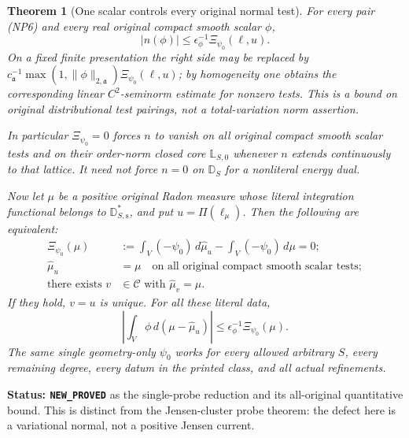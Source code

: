 \documentclass[11pt,a4paper]{article}
\numberwithin{equation}{section}
\newtheorem{theorem}{Theorem}[section]
\theoremstyle{definition}
\theoremstyle{remark}
\begin{document}
\begin{theorem}[One scalar controls every original normal test]
\label{thm:r12-one-probe-normal-detector}
For every pair \textup{(NP6)} and every real original
compact smooth scalar $\phi$,
\[
            |n(\phi)|
                 \le\epsilon_\phi^{-1}\Xi_{\psi_0}(\ell,u).
 \tag{NP8}
\]
On a fixed finite presentation the right side may be
replaced by
$c_{\mathfrak a}^{-1}\max(1,\|\phi\|_{2,\mathfrak a})
\Xi_{\psi_0}(\ell,u)$; by homogeneity one obtains the
corresponding linear $C^2$-seminorm estimate for nonzero
tests.  This is a bound on original distributional test
pairings, not a total-variation norm assertion.

In particular $\Xi_{\psi_0}=0$ forces $n$ to vanish on
all original compact smooth scalar tests and on their
order-norm closed core $\mathbb L_{S,0}$ whenever $n$
extends continuously to that lattice.  It need not force
$n=0$ on $\mathbb D_S$ for a nonliteral energy dual.

Now let $\mu$ be a positive original Radon measure whose
\emph{literal} integration functional belongs to
$\mathbb D_{S,\mathrm s}^*$, and put $u=\Pi(\ell_\mu)$.
Then the following are equivalent:
\[
 \begin{split}
 \Xi_{\psi_0}(\mu)
   &:=\int_V(-\psi_0)\,d\widehat\mu_u
                      -\int_V(-\psi_0)\,d\mu=0;\\
 \widehat\mu_u&=\mu
        \quad\text{on all original compact smooth scalar tests};\\
 \text{there exists }v&\in\mathscr C
                         \text{ with }\widehat\mu_v=\mu.
 \end{split}
 \tag{NP9}
\]
If they hold, $v=u$ is unique.  For all these literal data,
\[
 \left|\int_V\phi\,d(\mu-\widehat\mu_u)\right|
                        \le\epsilon_\phi^{-1}\Xi_{\psi_0}(\mu).
 \tag{NP10}
\]
The same single geometry-only $\psi_0$ works for every
allowed arbitrary $S$, every remaining degree, every
datum in the printed class, and all actual refinements.
\end{theorem}

\noindent\textbf{Status: \texttt{NEW\_PROVED}} as the
single-probe reduction and its all-original quantitative
bound.  This is distinct from the Jensen-cluster probe
theorem: the defect here is a variational normal, not
a positive Jensen current.
\end{document}

